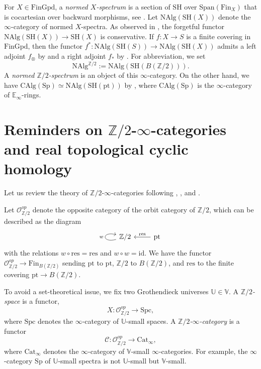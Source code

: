 \documentclass[10pt]{amsart}
\theoremstyle{definition}
\numberwithin{equation}{section}
\newcommand{\E}{\mathbb{E}}
\newcommand{\Z}{\mathbb{Z}}
\newcommand{\cC}{\mathcal{C}}
\newcommand{\cO}{\mathcal{O}}
\newcommand{\pt}{\mathrm{pt}}
\newcommand{\CAlg}{\mathrm{CAlg}}
\newcommand{\NAlg}{\mathrm{NAlg}}
\newcommand{\Sp}{\mathrm{Sp}}
\newcommand{\id}{\mathrm{id}}
\newcommand{\Fin}{\mathrm{Fin}}
\newcommand{\Spc}{\mathrm{Spc}}
\newcommand{\Span}{\mathrm{Span}}
\newcommand{\Cat}{\mathrm{Cat}}
\newcommand{\FinGpd}{\mathrm{FinGpd}}
\newcommand{\SH}{\mathrm{SH}}
\newcommand{\res}{\mathrm{res}}
\begin{document}
For $X\in \FinGpd$, a \emph{normed $X$-spectrum} is a section of $\SH$ over $\Span(\Fin_X)$ that is cocartesian over backward morphisms, see \cite[Definition 9.14]{BH21}.
Let $\NAlg(\SH(X))$ denote the $\infty$-category of normed $X$-spectra.
As observed in \cite[\S A.1]{HP23},
the forgetful functor $\NAlg(\SH(X))\to \SH(X)$ is conservative.
If $f\colon X\to S$ is a finite covering in $\FinGpd$,
then the functor $f^*\colon \NAlg(\SH(S))\to \NAlg(\SH(X))$ admits a left adjoint $f_\otimes$ by \cite[Proposition A.1.11]{HP23} and a right adjoint $f_*$ by \cite[Proposition A.1.12]{HP23}.
For abbreviation,
we set
\[
\NAlg^{\Z/2}:=\NAlg(\SH(B (\Z/2))).
\]
A \emph{normed $\Z/2$-spectrum} is an object of this $\infty$-category.
On the other hand,
we have $\CAlg(\Sp)\simeq \NAlg(\SH(\pt))$ by \cite[Example 9.15]{BH21},
where $\CAlg(\Sp)$ is the $\infty$-category of $\E_\infty$-rings.



\section{Reminders on \texorpdfstring{$\Z/2$-$\infty$-}{Z/2-infinity }categories and real topological cyclic homology}

Let us review the theory of $\Z/2$-$\infty$-categories following \cite{MR4587313}, \cite{2109.11954}, and \cite{QS21}.



Let $\cO_{\Z/2}^{op}$ denote the opposite category of the orbit category of $\Z/2$,
which can be described as the diagram
\[
\begin{tikzcd}
\Z/2 \ar[r,leftarrow,"\res"]\ar[loop left,"w"]&
\pt
\end{tikzcd}
\]
with the relations $w\circ \res=\res$ and $w\circ w=\id$.
We have the functor $\cO_{\Z/2}^{op}\to \Fin_{B(\Z/2)}$ sending $\pt$ to $\pt$, $\Z/2$ to $B(\Z/2)$, and $\res$ to the finite covering $\pt\to B(\Z/2)$.

To avoid a set-theoretical issue,
we fix two Grothendieck universes $\mathbb{U}\in \mathbb{V}$.
A \emph{$\Z/2$-space} is a functor,
\[
X\colon \cO_{\Z/2}^{op}\to \Spc,
\]
where $\Spc$ denotes the $\infty$-category of $\mathbb{U}$-small spaces.
A \emph{$\Z/2$-$\infty$-category} is a functor
\[
\cC\colon \cO_{\Z/2}^{op}\to \Cat_\infty,
\]
where $\Cat_\infty$ denotes the $\infty$-category of $\mathbb{V}$-small $\infty$-categories.
For example, the $\infty$-category $\Sp$ of $\mathbb{U}$-small spectra is not $\mathbb{U}$-small but $\mathbb{V}$-small.
\end{document}
